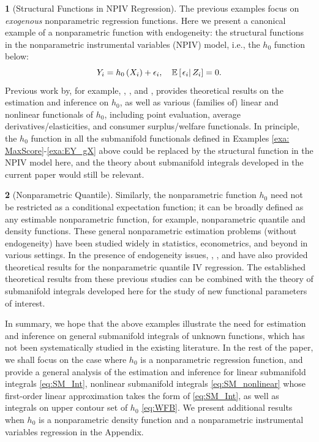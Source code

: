 \documentclass[12pt,american]{article}
\theoremstyle{definition}
\newtheorem{example}{\protect\examplename}
\theoremstyle{plain}
\theoremstyle{definition}
\theoremstyle{plain}
\theoremstyle{plain}
\theoremstyle{plain}
\theoremstyle{plain}
\theoremstyle{plain}
\newcommand{\E}{\mathbb{E}}
\providecommand{\examplename}{Example}
\providecommand{\examplename}{Example}
\begin{document}
\begin{example}[Structural Functions in NPIV Regression]
  \label{exa:NPIV} The previous examples focus on \emph{exogenous}
  nonparametric regression functions. Here we present a canonical example
  of a nonparametric function with endogeneity: the structural functions
  in the nonparametric instrumental variables (NPIV) model, i.e., the
  $h_{0}$ function below:
  \[
    Y_{i}=h_{0}\left(X_{i}\right)+\e_{i},\quad\E\left[\rest{\e_{i}}Z_{i}\right]=0.
  \]
  Previous work by, for example,
  \citet*{chenpouzo2015sieve}, \citet*{chen2018optimal}, and \citet*{chen2025adaptive},
  provides theoretical results on the estimation and inference on $h_{0}$,
  as well as various (families of) linear and nonlinear functionals
  of $h_{0}$, including point evaluation, average derivatives/elasticities,
  and consumer surplus/welfare functionals. In principle, the $h_{0}$
  function in all the submanifold functionals defined in Examples \ref{exa: MaxScore}-\ref{exa:EY_gX}
  above could be replaced by the structural function in the NPIV model
  here, and the theory about submanifold integrals developed
  in the current paper would still be relevant.
\end{example}
%
\begin{example}[Nonparametric Quantile]
  \label{exa:NPqt} Similarly, the nonparametric function $h_{0}$
  need not be restricted as a conditional expectation function; it
  can be broadly defined as any estimable nonparametric function, for
  example, nonparametric quantile and density functions. These
  general nonparametric estimation problems (without endogeneity) have
  been studied widely in statistics, econometrics, and beyond in various
  settings. In the presence of endogeneity issues, \citet*{HL07econometrica}, \citet*{chenpouzo2015sieve}, and \citet*{chen2019penalized}
  have also provided theoretical results for the nonparametric quantile
  IV regression. The established
  theoretical results from these previous studies can be combined with
  the theory of submanifold integrals developed here for the study of
  new functional parameters of interest.
\end{example}

In summary, we hope that the above examples illustrate the need for estimation and inference on general submanifold integrals of unknown functions, which has not been systematically studied in the existing literature.
In the rest of the paper, 
we shall focus on the case where $h_0$ is a nonparametric regression function, and provide a general analysis of the estimation and inference for linear submanifold integrals \eqref{eq:SM_Int}, nonlinear submanifold integrals \eqref{eq:SM_nonlinear} whose first-order linear approximation takes the form of \eqref{eq:SM_Int}, as well as integrals on upper contour set of $h_0$ \eqref{eq:WFB}. We present additional results when $h_0$ is a nonparametric density function and a nonparametric instrumental variables regression in the Appendix.
\end{document}
